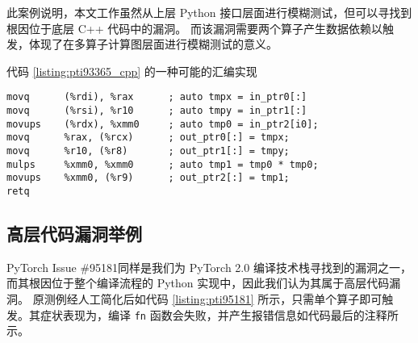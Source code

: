 此案例说明，本文工作虽然从上层 Python 接口层面进行模糊测试，但可以寻找到根因位于底层 C++ 代码中的漏洞。
而该漏洞需要两个算子产生数据依赖以触发，体现了在多算子计算图层面进行模糊测试的意义。

\begin{listing}[]
    \caption{代码 \ref{listing:pti93365_cpp} 的一种可能的汇编实现}
    \label{listing:pti93365_asm}
\begin{verbatim}
movq      (%rdi), %rax      ; auto tmpx = in_ptr0[:]
movq      (%rsi), %r10      ; auto tmpy = in_ptr1[:]
movups    (%rdx), %xmm0     ; auto tmp0 = in_ptr2[i0];
movq      %rax, (%rcx)      ; out_ptr0[:] = tmpx;
movq      %r10, (%r8)       ; out_ptr1[:] = tmpy;
mulps     %xmm0, %xmm0      ; auto tmp1 = tmp0 * tmp0;
movups    %xmm0, (%r9)      ; out_ptr2[:] = tmp1;
retq
\end{verbatim}
\end{listing}

\subsection{高层代码漏洞举例}

PyTorch Issue \#95181\cite{pti95181}同样是我们为 PyTorch 2.0 编译技术栈寻找到的漏洞之一，而其根因位于整个编译流程的 Python 实现中，因此我们认为其属于高层代码漏洞。
原测例经人工简化后如代码 \ref{listing:pti95181} 所示，只需单个算子即可触发。其症状表现为，编译 \texttt{fn} 函数会失败，并产生报错信息如代码最后的注释所示。

